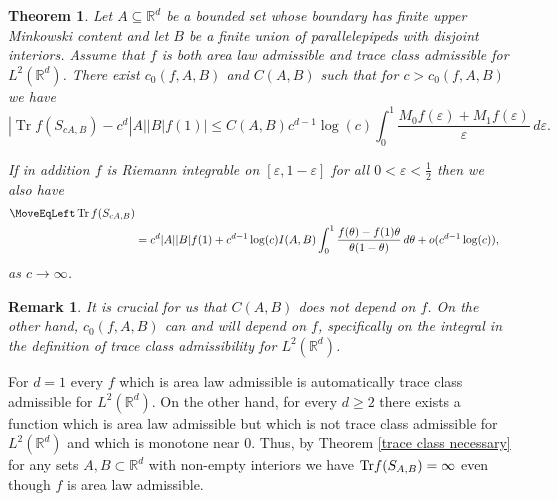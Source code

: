 \documentclass[12pt]{amsart}
\numberwithin{equation}{section}
\newcommand{\R}{\mathbb{R}}
\newcommand{\eps}{\varepsilon}
\newtheorem{theorem}[Thm]{Theorem}
\newtheorem{remark}[Thm]{Remark}
\begin{document}
\begin{theorem}\label{good area law}
Let $A\subseteq \R^d$ be a bounded set whose boundary has finite upper Minkowski content and let $B$ be a finite union of parallelepipeds with disjoint interiors. Assume that $f$ is both  area law admissible and trace class admissible for $L^2(\R^d)$. There exist $c_0(f, A, B)$ and $C(A, B)$ such that for $c > c_0(f, A, B)$ we have
\begin{equation}\label{area law uniform bound}
|\operatorname{Tr} f(S_{cA,B})- c^d |A||B| f(1)|\leq C(A,B) c^{d-1}\log(c) \int_0^1 \frac{M_0 f(\eps) + M_1 f(\eps)}{\eps} \, d\eps.
\end{equation}

If in addition $f$ is Riemann integrable on $[\eps, 1-\eps]$ for all $0 < \eps < \frac{1}{2}$ then we also have
\begin{equation}\label{area law two term}
\begin{aligned}
\MoveEqLeft \operatorname{Tr} f(S_{cA,B})\\
&= c^{d} |A| |B|f(1) +  c^{d-1}\log(c)I( A, B)\int_{0}^1 \frac{f(\theta) - f(1)\theta}{\theta(1-\theta)} \, d\theta + o(c^{d-1}\log(c)),
\end{aligned}
\end{equation}
as $c\to \infty$.
\end{theorem}
\begin{remark}
It is crucial for us that $C(A,B)$ does not depend on $f$. On the other hand, $c_0(f, A, B)$ can and will depend on $f$, specifically on the integral in the definition of trace class admissibility for $L^2(\R^d)$.
\end{remark}


For $d = 1$ every $f$ which is area law admissible is automatically trace class admissible for $L^2(\R^d)$. On the other hand, for every $d\ge 2$ there exists a function which is area law admissible but which is not trace class admissible for $L^2(\R^d)$ and which is monotone near $0$. Thus, by Theorem \ref{trace class necessary} for any sets $A, B\subset \R^d$ with non-empty interiors we have ${\rm Tr} f(S_{A,B}) = \infty$ even though $f$ is area law admissible.
\end{document}
